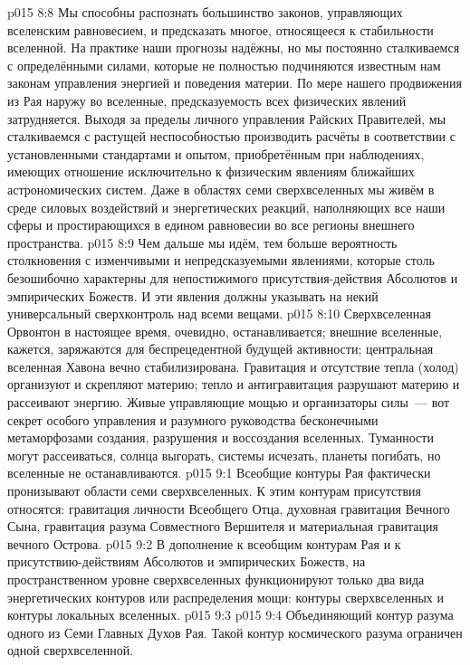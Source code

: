 \vs p015 8:8 Мы способны распознать большинство законов, управляющих вселенским равновесием, и предсказать многое, относящееся к стабильности вселенной. На практике наши прогнозы надёжны, но мы постоянно сталкиваемся с определёнными силами, которые не полностью подчиняются известным нам законам управления энергией и поведения материи. По мере нашего продвижения из Рая наружу во вселенные, предсказуемость всех физических явлений затрудняется. Выходя за пределы личного управления Райских Правителей, мы сталкиваемся с растущей неспособностью производить расчёты в соответствии с установленными стандартами и опытом, приобретённым при наблюдениях, имеющих отношение исключительно к физическим явлениям ближайших астрономических систем. Даже в областях семи сверхвселенных мы живём в среде силовых воздействий и энергетических реакций, наполняющих все наши сферы и простирающихся в едином равновесии во все регионы внешнего пространства.
\vs p015 8:9 Чем дальше мы идём, тем больше вероятность столкновения с изменчивыми и непредсказуемыми явлениями, которые столь безошибочно характерны для непостижимого присутствия\hyp{}действия Абсолютов и эмпирических Божеств. И эти явления должны указывать на некий универсальный сверхконтроль над всеми вещами.
\vs p015 8:10 Сверхвселенная Орвонтон в настоящее время, очевидно, останавливается; внешние вселенные, кажется, заряжаются для беспрецедентной будущей активности; центральная вселенная Хавона вечно стабилизирована. Гравитация и отсутствие тепла (холод) организуют и скрепляют материю; тепло и антигравитация разрушают материю и рассеивают энергию. Живые управляющие мощью и организаторы силы~--- вот секрет особого управления и разумного руководства бесконечными метаморфозами создания, разрушения и воссоздания вселенных. Туманности могут рассеиваться, солнца выгорать, системы исчезать, планеты погибать, но вселенные не останавливаются.
\vs p015 9:1 Всеобщие контуры Рая фактически пронизывают области семи сверхвселенных. К этим контурам присутствия относятся: гравитация личности Всеобщего Отца, духовная гравитация Вечного Сына, гравитация разума Совместного Вершителя и материальная гравитация вечного Острова.
\vs p015 9:2 В дополнение к всеобщим контурам Рая и к присутствию\hyp{}действиям Абсолютов и эмпирических Божеств, на пространственном уровне сверхвселенных функционируют только два вида энергетических контуров или распределения мощи: контуры сверхвселенных и контуры локальных вселенных.
\vs p015 9:3 \pc {}
\vs p015 9:4 Объединяющий контур разума одного из Семи Главных Духов Рая. Такой контур космического разума ограничен одной сверхвселенной.
